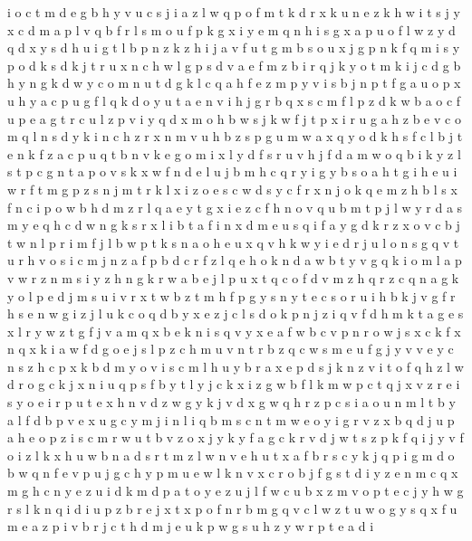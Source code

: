 \documentclass{article}
\begin{document}
i o c t m d
e g b h y v u c s j i a z l w q p o f m t k d r x
k
u n e z k h w i t s j y x c d m a p l v q b f r
l s m o
u f p k g x i y e m
q n h i s g x a p u o f l w z y d
q d
x
y s d h u i g t l b p n z
k z h i j a v f u t g m b s
o u x j g p n k
f q m i s y p o d k
s d k j t r
u x n c h w l g p s d v a e f m z b i r q j k y o t
m k i j c d g b h y n
g k d w y c o m
n u t d g k l c q a h f e z m p y v i
s b j n p t f g a u o
p x u h y a
c p u
g f l q k d
o y u t a e n v i h j g r b q x s c m f l p z d k w
b
a o c f u p
e a g t r c u l z p v i y q d x m o h b w s j k
w f j t p x i r u g a h z b e v c o m q l n s d y k
i n c h z r
x n m v u h b z s
p g u m w a x q y o d k h s f c l b j t e n
k f
z a c p u q t b n v k e g o m i x l y d f s r
u v h j f d a m w o q b i k y z l s t p c g n
t a p o v s k x w f n d e l u j b m h c q r y i g
y b s
o a h t g i
h e u i w r f t m g p z s n
j m t r k l x i z o e s c w d
s y c f r x n j o k q e m z h b l
s x f n c i p o w b h d m z r l q a e y t
g x i e z c f h n o v q u b m t p j l w y r d a s
m y e q h c d w n g k s r x l i b t a
f i n x d
m e u s q i f a y g d k r z x o v c b j t w n l p
r i m f j l b w p t k s n a o h e u x q v
h k w y i e d r j u l o n s g q v
t u r h v o s i c m j n z a f p b d
c r f z l q e h o k n d a w b t y v
g q k i o m l a p v w r z
n
m s i y z h n g k r w a b e j l p u x t q c o f d v
m z h q r
z c q n a g k y o l p e d j m s u i v r x t w b
z t m h f p g y s
n y t e c s o r u i h b k j v g f
r h s e n w g i z j l u k c o q d b y
x e z j c l s d o k
p n j z i q v f d h m k t a g e s x l r y
w z t g f j v a m q x b e
k n i s q v y x e a f w b c
v p n r o w j s x c k f
x n
q x k i a w f d g o e j s l p z c h m u v n t r b
z q c w s m e u f g j y v
v e y c n
s z
h c p x k b d m y o v i s
c m l h u y b r a x e p d s j k n z v i t o f q
h z l w d r o g c k j x n i u q p s f b y t
l
y j c k x
i z g w b
f l k m w p c t q j x v z r e i s y o
e i
r p u t e x h n v d z w g y
k j v d x g w q h r z p c s i a o u n m l t b y
a l f d b p v e x u g c y m j i n
l i q b m
s c n t m w e o y i g r v z x b q d j u p a h
e o p z i s c m r w u t
b v z o x j y k
y f a g c k r v d j w t s z
p k f q i
j y v f o i z l k x h u w b n a d s r t m
z l w n v e h u t x a f b r s c y k j q p i g m d o
b w q n f e v p u j g c h y
p m u e w l k n v x c r o b j f g s t d i y
z e n m c
q x m g h c n y e z u i d k
m d p a t o y e z u j l f w c
u b x z m v o p t e c j y h w g r s l k n q i
d i u p z b r e j x t
x p o f n r b m g q v c l w z t u
w o g y s q x f u m e a z p i v b r j c t h d
m j e u k p w g
s u h z y w r p t e a d i
\end{document}
